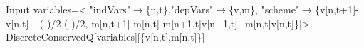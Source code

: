 \begin{mmaCell}[moredefined={variables, DiscreteConservedQ}]{Input}
  variables=<|"indVars"\(\pmb{\to}\)\{n,t\},"depVars"\(\pmb{\to}\)\{v,m\},
  "scheme"\(\pmb{\to}\)\{v[n,t+1]-v[n,t]
  +(-)/2-(-)/2,
  m[n,t+1]-m[n,t]-m[n+1,t]v[n+1,t]+m[n,t]v[n,t]\}|>
  DiscreteConservedQ[variables][\{v[n,t],m[n,t]\}]
  
\end{mmaCell}